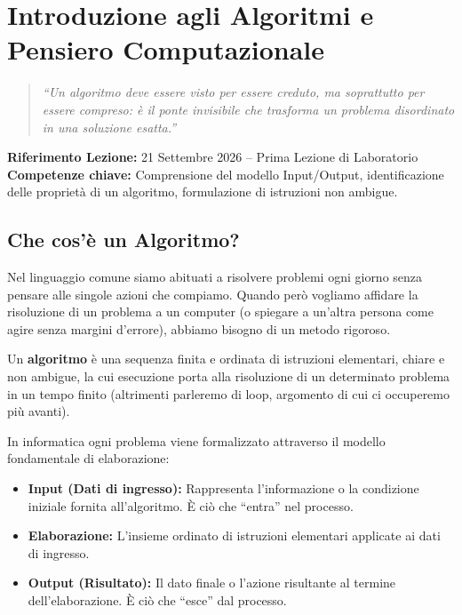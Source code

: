 \chapter{Introduzione agli Algoritmi e Pensiero Computazionale}
\label{chap:intro-algoritmi}

\begin{quote}
\itshape
\small
``Un algoritmo deve essere visto per essere creduto, ma soprattutto per essere compreso: è il ponte invisibile che trasforma un problema disordinato in una soluzione esatta.''
\end{quote}
\vspace{1em}

\noindent\textbf{Riferimento Lezione:} 21 Settembre 2026 -- Prima Lezione di Laboratorio\\
\textbf{Competenze chiave:} Comprensione del modello Input/Output, identificazione delle proprietà di un algoritmo, formulazione di istruzioni non ambigue.

\vspace{1.5em}

\section{Che cos'è un Algoritmo?}

Nel linguaggio comune siamo abituati a risolvere problemi ogni giorno senza pensare alle singole azioni che compiamo. 
Quando però vogliamo affidare la risoluzione di un problema a un computer (o spiegare a un'altra persona come agire senza margini d'errore), abbiamo bisogno di un metodo rigoroso.

\begin{concetto}
Un \textbf{algoritmo} è una sequenza finita e ordinata di istruzioni elementari, chiare e non ambigue, la cui esecuzione porta alla risoluzione di un determinato problema in un tempo finito (altrimenti parleremo di loop, argomento di cui ci occuperemo più avanti).
\end{concetto}

In informatica ogni problema viene formalizzato attraverso il modello fondamentale di elaborazione:

\begin{itemize}
  \item \textbf{Input (Dati di ingresso):} Rappresenta l'informazione o la condizione iniziale fornita all'algoritmo. È ciò che ``entra'' nel processo.
  \item \textbf{Elaborazione:} L'insieme ordinato di istruzioni elementari applicate ai dati di ingresso.
  \item \textbf{Output (Risultato):} Il dato finale o l'azione risultante al termine dell'elaborazione. È ciò che ``esce'' dal processo.
\end{itemize}

